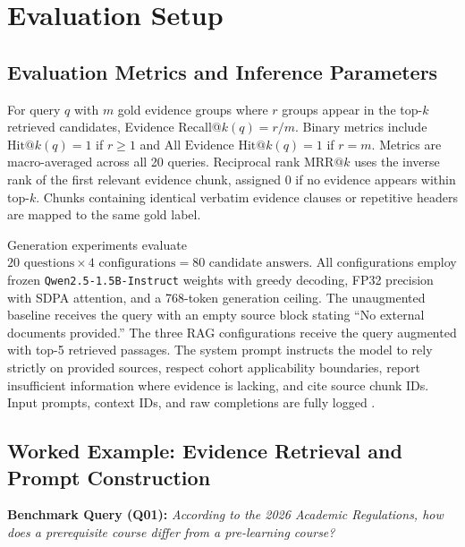 \documentclass[12pt,a4paper]{article}
\begin{document}
\section{Evaluation Setup}

\subsection{Evaluation Metrics and Inference Parameters}

For query $q$ with $m$ gold evidence groups where $r$ groups appear in the top-$k$ retrieved candidates, Evidence Recall@$k(q) = r/m$. Binary metrics include $\text{Hit@}k(q) = 1$ if $r \ge 1$ and $\text{All Evidence Hit@}k(q) = 1$ if $r = m$. Metrics are macro-averaged across all 20 queries. Reciprocal rank $\text{MRR@}k$ uses the inverse rank of the first relevant evidence chunk, assigned 0 if no evidence appears within top-$k$. Chunks containing identical verbatim evidence clauses or repetitive headers are mapped to the same gold label.

Generation experiments evaluate $20 \text{ questions} \times 4 \text{ configurations} = 80 \text{ candidate answers}$. All configurations employ frozen \texttt{Qwen2.5-1.5B-Instruct} weights with greedy decoding, FP32 precision with SDPA attention, and a 768-token generation ceiling. The unaugmented baseline receives the query with an empty source block stating ``No external documents provided.'' The three RAG configurations receive the query augmented with top-5 retrieved passages. The system prompt instructs the model to rely strictly on provided sources, respect cohort applicability boundaries, report insufficient information where evidence is lacking, and cite source chunk IDs. Input prompts, context IDs, and raw completions are fully logged \cite{ref1,ref6}.

\subsection{Worked Example: Evidence Retrieval and Prompt Construction}

\textbf{Benchmark Query (Q01):} \emph{According to the 2026 Academic Regulations, how does a prerequisite course differ from a pre-learning course?}
\end{document}

